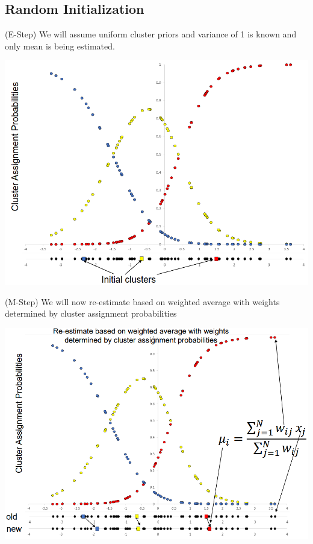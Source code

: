 \documentclass[10pt]{article}
\begin{document}
\subsection*{Random Initialization}
(E-Step) We will assume uniform cluster priors and variance of 1 is known and only mean is being estimated.
\begin{center}
    \includegraphics*[width=\textwidth]{W6_35.png}
\end{center}
(M-Step) We will now re-estimate based on weighted average with weights determined by cluster assignment probabilities
\begin{center}
    \includegraphics*[width=\textwidth]{W6_36.png}
\end{center}
\end{document}
